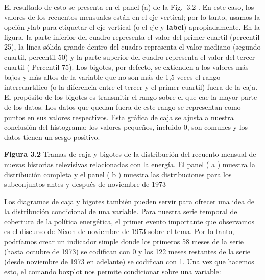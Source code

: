 \documentclass[
]{book}
\newenvironment{Shaded}{\begin{snugshade}}{\end{snugshade}}
\newcommand{\AttributeTok}[1]{\textcolor[rgb]{0.77,0.63,0.00}{#1}}
\newcommand{\FunctionTok}[1]{\textcolor[rgb]{0.00,0.00,0.00}{#1}}
\newcommand{\NormalTok}[1]{#1}
\newcommand{\SpecialCharTok}[1]{\textcolor[rgb]{0.00,0.00,0.00}{#1}}
\newcommand{\StringTok}[1]{\textcolor[rgb]{0.31,0.60,0.02}{#1}}
\begin{document}
\begin{Shaded}
\end{Shaded}

El resultado de esto se presenta en el panel (a) de la Fig.  3.2 . En este caso, los valores de los recuentos mensuales están en el eje vertical; por lo tanto, usamos la opción ylab para etiquetar el eje vertical (o el eje y \textbf{label}) apropiadamente. En la figura, la parte inferior del cuadro representa el valor del primer cuartil (percentil 25), la línea sólida grande dentro del cuadro representa el valor mediano (segundo cuartil, percentil 50) y la parte superior del cuadro representa el valor del tercer cuartil ( Percentil 75). Los bigotes, por defecto, se extienden a los valores más bajos y más altos de la variable que no son más de 1,5 veces el rango intercuartílico (o la diferencia entre el tercer y el primer cuartil) fuera de la caja. El propósito de los bigotes es transmitir el rango sobre el que cae la mayor parte de los datos. Los datos que quedan fuera de este rango se representan como puntos en sus valores respectivos. Esta gráfica de caja se ajusta a nuestra conclusión del histograma: los valores pequeños, incluido 0, son comunes y los datos tienen un sesgo positivo.

\textbf{Figura 3.2} Tramas de caja y bigotes de la distribución del recuento mensual de nuevas historias televisivas relacionadas con la energía. El panel ( a ) muestra la distribución completa y el panel ( b ) muestra las distribuciones para los subconjuntos antes y después de noviembre de 1973

Los diagramas de caja y bigotes también pueden servir para ofrecer una idea de la distribución condicional de una variable. Para nuestra serie temporal de cobertura de la política energética, el primer evento importante que observamos es el discurso de Nixon de noviembre de 1973 sobre el tema. Por lo tanto, podríamos crear un indicador simple donde los primeros 58 meses de la serie (hasta octubre de 1973) se codifican con 0 y los 122 meses restantes de la serie (desde noviembre de 1973 en adelante) se codifican con 1. Una vez que hacemos esto, el comando boxplot nos permite condicionar sobre una variable:
\end{document}
